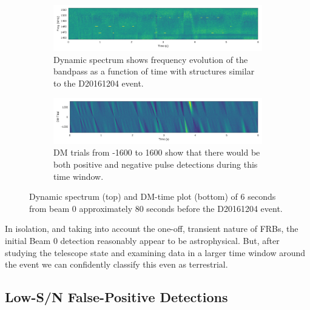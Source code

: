 \documentclass[a4paper,fleqn,usenatbib]{mnras}
\begin{document}
\begin{figure}
    \centering
    \begin{subfigure}[t]{1.0\textwidth}
        \centering\captionsetup{width=.95\linewidth}
        \includegraphics[width=1.0\textwidth]{figures/D20161204_spect_buf21_Beam0.pdf}
        \caption{Dynamic spectrum shows frequency evolution of the bandpass as a
        function of time with structures similar to the D20161204 event.
        }
        \label{fig:beam0_dynamic_spec_80s}
    \end{subfigure}
    \begin{subfigure}[t]{1.0\textwidth}
        \centering\captionsetup{width=.95\linewidth}
        \includegraphics[width=1.0\textwidth]{figures/D20161204_dmtrials_buf21_Beam0.pdf}
        \caption{DM trials from -1600 to 1600 show that there would be both
        positive and negative pulse detections during this time window.
        }
        \label{fig:beam0_dmtrials_80s}
    \end{subfigure}
    \caption{Dynamic spectrum (top) and DM-time plot (bottom) of 6 seconds from
    beam 0 approximately 80 seconds before the D20161204 event.
    }
    \label{fig:beamo0_80s}
\end{figure}

In isolation, and taking into account the one-off, transient nature of FRBs, the
initial Beam 0 detection reasonably appear to be astrophysical. But, after
studying the telescope state and examining data in a larger time window around
the event we can confidently classify this even as terrestrial.

\subsection{Low-S/N False-Positive Detections}
\label{sec:low_snr}
\end{document}
